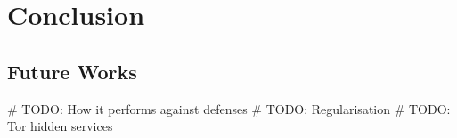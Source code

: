 \section{Conclusion}

\subsection{Future Works}
# TODO: How it performs against defenses
# TODO: Regularisation
# TODO: Tor hidden services
